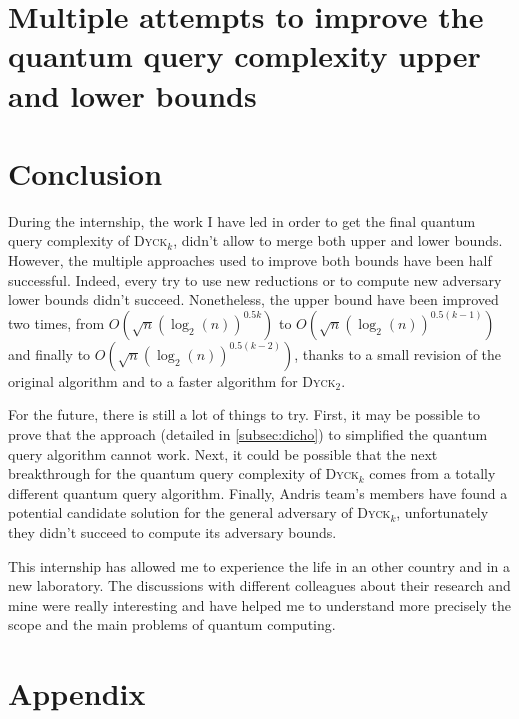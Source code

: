 \documentclass[11pt,a4paper]{article}
\newcommand{\Dyck}[1]{\textsc{Dyck$_{#1}$}}
\theoremstyle{definition}
\theoremstyle{plain}
\theoremstyle{definition}
\begin{document}
\section{Multiple attempts to improve the quantum query complexity upper and lower bounds}
\label{tries_section}



\section{Conclusion}

During the internship, the work I have led  in order to get the
final quantum query complexity of \Dyck{k}, didn't allow to merge
both  upper and lower bounds. However, the multiple approaches used
to improve both bounds have been half successful. Indeed, every
try to use new reductions or to compute new adversary lower bounds
didn't succeed. Nonetheless, the upper bound have been improved
two times, from $O(\sqrt{n}(\log_2(n))^{0.5k})$ to
$O(\sqrt{n}(\log_2(n))^{0.5(k-1)})$ and finally to
$O(\sqrt{n}(\log_2(n))^{0.5(k-2)})$, thanks to a small revision
of the original algorithm and to a faster algorithm for \Dyck{2}.

For the future, there is still a lot of things to try. First,
it may be possible to prove that the approach (detailed in
\autoref{subsec:dicho}) to simplified the quantum query algorithm
cannot work. Next, it could be possible that the next breakthrough
for the quantum query complexity of \Dyck{k} comes from a totally
different quantum query algorithm. Finally, Andris team's members
have found a potential candidate solution for the general adversary
of \Dyck{k}, unfortunately they didn't succeed to compute its adversary
bounds.

This internship has allowed me to experience the life in an other
country and in a new laboratory. The discussions with different
colleagues about their research and mine were really interesting
and have helped me to understand more precisely the scope and the main
problems of quantum computing.







\newpage

\section{Appendix}

\listoffigures
\listofalgorithms


\end{document}
